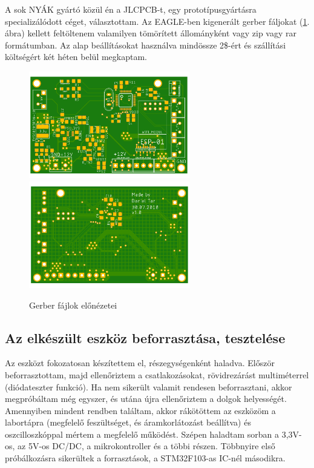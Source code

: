 \documentclass[../main.tex]{subfiles}
\begin{document}
            A sok NYÁK gyártó közül én a JLCPCB-t, egy prototípusgyártásra specializálódott céget, választottam. Az EAGLE-ben kigenerált gerber fáljokat (\ref{fig:gerber_v10}. ábra) kellett feltöltenem valamilyen tömörített állományként vagy zip vagy rar formátumban. Az alap beállításokat használva mindössze 2\$-ért és szállítási költségért két héten belül megkaptam.
            
            \begin{figure}[h!]
                \centering
                    \includegraphics[width=7cm]{resources/pcb_res/pcb_top_v10.png}
                    \includegraphics[width=7cm]{resources/pcb_res/pcb_bottom_v10.png}
                \caption{Gerber fájlok előnézetei}
                \label{fig:gerber_v10}
            \end{figure}

    \subsection{Az elkészült eszköz beforrasztása, tesztelése}
        Az eszközt fokozatosan készítettem el, részegységenként haladva. Először beforrasztottam, majd ellenőriztem a csatlakozásokat, rövidrezárást multiméterrel (diódateszter funkció). Ha nem sikerült valamit rendesen beforrasztani, akkor megpróbáltam még egyszer, és utána újra ellenőriztem a dolgok helyességét. Amennyiben mindent rendben találtam, akkor rákötöttem az eszközöm a labortápra (megfelelő feszültséget, és áramkorlátozást beállítva) és oszcilloszkóppal mértem a megfelelő működést. Szépen haladtam sorban a 3,3V-os, az 5V-os DC/DC, a mikrokontroller és a többi részen. Többnyire első próbálkozásra sikerültek a forrasztások, a STM32F103-as IC-nél másodikra.
        
\end{document}
